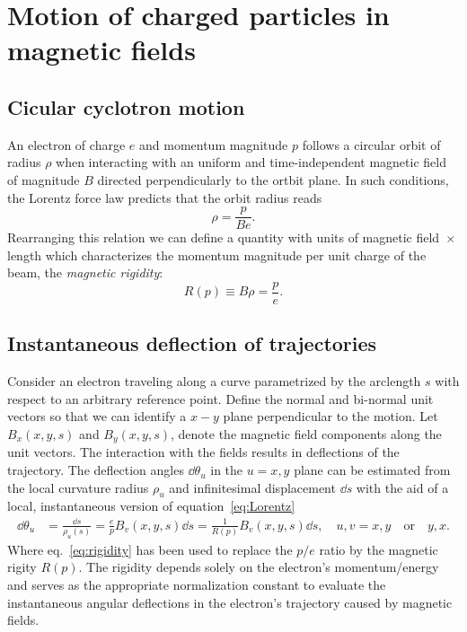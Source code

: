 \section{Motion of charged particles in magnetic fields}
\subsection{Cicular cyclotron motion}
An electron of charge $e$ and momentum magnitude $p$ follows a circular orbit of radius $\rho$ when interacting with an uniform and time-independent magnetic field of magnitude $B$ directed perpendicularly to the ortbit plane. In such conditions, the Lorentz force law predicts that the orbit radius reads
\begin{equation}
    \rho = \frac{p}{Be}.
    \label{eq:Lorentz}
\end{equation}
Rearranging this relation we can define a quantity with units of magnetic field~$\times$ length which characterizes the momentum magnitude per unit charge of the beam, the \textit{magnetic rigidity}:
\begin{equation}
    R(p) \equiv B\rho = \frac{p}{e}.
    \label{eq:rigidity}
\end{equation}
\subsection{Instantaneous deflection of trajectories}
Consider an electron traveling along a curve parametrized by the arclength $s$ with respect to an arbitrary reference point. Define the normal and bi-normal unit vectors so that we can identify a $x-y$ plane perpendicular to the motion.  Let $B_x(x,y,s)$  and $B_y(x,y,s)$, denote the magnetic field components along the unit vectors. The interaction with the fields results in deflections of the trajectory. The deflection angles $\dd\theta_u$ in the $u=x,y$ plane can be estimated from the local curvature radius $\rho_u$ and infinitesimal displacement $\dd{s}$ with the aid of a local, instantaneous version of equation~\eqref{eq:Lorentz}
    \begin{equation}
        \begin{aligned}
            \dd{\theta_u} & = \frac{\dd{s}}{\rho_u(s)} = \frac{e}{p}B_v(x,y,s)\dd s = \frac{1}{R(p)}B_v(x,y,s)\dd s, \quad u,v=x, y \quad\text{or}\quad y,x.
        \end{aligned}
        \label{eq:deflec_angles}
    \end{equation}
Where eq.~\eqref{eq:rigidity} has been used to replace the $p/e$ ratio by the magnetic rigity $R(p)$. The rigidity depends solely on the electron's momentum/energy and serves as the appropriate normalization constant to evaluate the instantaneous angular deflections in the electron's trajectory caused by magnetic fields.

